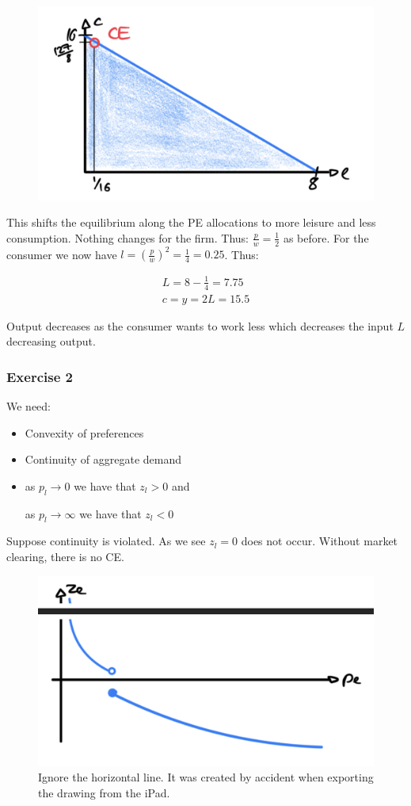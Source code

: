 {\begin{enumerate}[label=(\alph*)]
{\begin{figure}[h!]
    \centering
    \includegraphics[width=0.75\linewidth]{images/2013_14_2.png}
\end{figure}
}
{\item 
This shifts the equilibrium along the PE allocations to more leisure and less consumption. 
Nothing changes for the firm. Thus: $\frac{p}{w} = \frac{1}{2}$ as before. For the consumer we now have $l=\left(\frac{p}{w}\right)^2=\frac{1}{4}=0.25$.
Thus:

\begin{align*}
    L = 8 - \frac{1}{4} = 7.75 \\
    c = y = 2L = 15.5
\end{align*}

Output decreases as the consumer wants to work less which decreases the input $L$ decreasing output.
}
\end{enumerate}
}
{
\subsubsection*{Exercise 2}

We need:
\begin{itemize}
    \item Convexity of preferences
    \item Continuity of aggregate demand
    \item as $p_l \rightarrow 0$ we have that $z_l>0$ and
    
    as $p_l \rightarrow \infty$ we have that $z_l<0$
\end{itemize}

Suppose continuity is violated. As we see $z_l = 0$ does not occur. Without market clearing, there is no CE.

\begin{figure}[h!]
    \centering
    \includegraphics[width=0.75\linewidth]{images/2013_14_3.png}
    \caption{Ignore the horizontal line. It was created by accident when exporting the drawing from the iPad.}
\end{figure}
}
